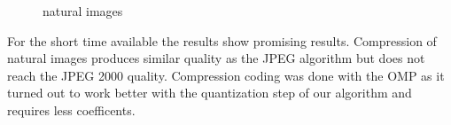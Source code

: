 \begin{figure}[h]
\centering

\hspace{5mm}
\hspace{5mm}
\hspace{5mm}
\caption{natural images}
\end{figure}

For the short time available the results show promising results. Compression of
natural images produces similar quality as the JPEG algorithm
 but does not reach the JPEG 2000 quality. 
Compression coding was done with the OMP as it turned out to work better with
the quantization step of our algorithm and requires less coefficents. 

